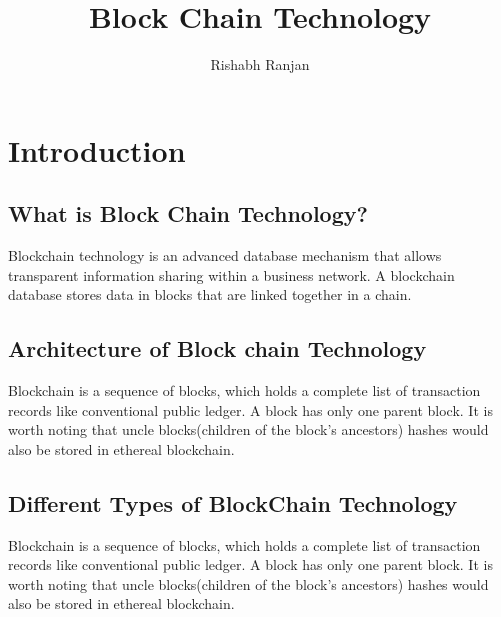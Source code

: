\documentclass[6pt,a4paper]{report}
\author{Rishabh Ranjan}
\title{Block Chain Technology}
\begin{document}
	\maketitle
	\chapter {Introduction}
	\section{What is Block Chain Technology?}
	Blockchain technology is an advanced database mechanism that allows transparent information
	sharing within a business network. A blockchain database stores data in blocks that are linked together
	in a chain.
	\section{Architecture of Block chain Technology}
	Blockchain is a sequence of blocks, which holds a complete list of transaction records like
	conventional public ledger. A block has only one parent block. It is worth noting that uncle
	blocks(children of the block’s ancestors) hashes would also be stored in ethereal blockchain.
	\section{Different Types of BlockChain Technology}
	Blockchain is a sequence of blocks, which holds a complete list of transaction records like
	conventional public ledger. A block has only one parent block. It is worth noting that uncle
	blocks(children of the block’s ancestors) hashes would also be stored in ethereal blockchain.
\end{document}
